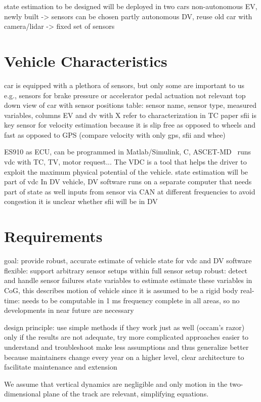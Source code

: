 state estimation to be designed will be deployed in two cars
non-autonomous EV, newly built -> sensors can be chosen
partly autonomous DV, reuse old car with camera/lidar -> fixed set of sensors

\section{Vehicle Characteristics}
car is equipped with a plethora of sensors, but only some are important to us
e.g., sensors for brake pressure or accelerator pedal actuation not relevant
top down view of car with sensor positions
table: sensor name, sensor type, measured variables, columns EV and dv with X
refer to characterization in TC paper
sfii is key sensor for velocity estimation because it is slip free as opposed to wheels and fast as opposed to GPS
 (compare velocity with only gps, sfii and whee)

ES910 as ECU, can be programmed in Matlab/Simulink, C, ASCET-MD~\cite[p.~17]{ETASGmbHStuttgart.2018}
runs \gls{vdc} with TC, TV, motor request...
The VDC is a tool that helps the driver to exploit the maximum physical potential of the vehicle.
state estimation will be part of \gls{vdc}
In DV vehicle, DV software runs on a separate computer that needs part of state as well
inputs from sensor via CAN at different frequencies to avoid congestion
it is unclear whether sfii will be in DV

\section{Requirements}
goal: provide robust, accurate estimate of vehicle state for \gls{vdc} and DV software 
flexible: support arbitrary sensor setups within full sensor setup
robust: detect and handle sensor failures
state variables to estimate
estimate these variables in CoG, this describes motion of vehicle since it is assumed to be a rigid body
real-time: needs to be computable in 1 ms frequency
complete in all areas, so no developments in near future are necessary

design principle: use simple methods if they work just as well (occam's razor)
only if the results are not adequate, try more complicated approaches
easier to understand and troubleshoot
make less assumptions and thus generalize better
because maintainers change every year
on a higher level, clear architecture to facilitate maintenance and extension

We assume that vertical dynamics are negligible and only motion in the two-dimensional plane of the track are relevant, simplifying equations.

